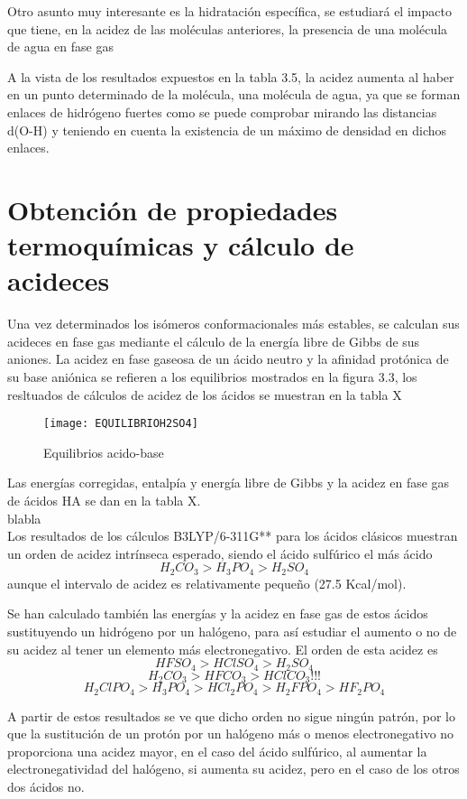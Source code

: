 Otro asunto muy interesante es la hidratación específica, se estudiará el impacto que tiene, en la acidez de las moléculas anteriores, la presencia de una molécula de agua en fase gas
 
A la vista de los resultados expuestos en la tabla 3.5, la acidez aumenta al haber en un punto determinado de la molécula, una molécula de agua, ya que se forman enlaces de hidrógeno fuertes como se puede comprobar mirando las distancias d(O-H) y teniendo en cuenta la existencia de un máximo de densidad en dichos enlaces.
 
\section{Obtención de propiedades termoquímicas y cálculo de acideces}

Una vez determinados los isómeros conformacionales más estables, se calculan sus acideces en fase gas mediante el cálculo de la energía libre de Gibbs de sus aniones.
La acidez en fase gaseosa de un ácido neutro y la afinidad protónica de su base aniónica se refieren a los equilibrios mostrados en la figura 3.3, los resltuados de cálculos de acidez de los ácidos se muestran en la tabla X
    \begin{figure}[h]
        \centering
        \texttt{[image: EQUILIBRIOH2SO4]}
        \caption{Equilibrios acido-base}
    \end{figure}

  

    
 
Las energías corregidas, entalpía y energía libre de Gibbs y la acidez en fase gas de ácidos HA se dan en la tabla X. \\
blabla \\

Los resultados de los cálculos B3LYP/6-311G** para los ácidos clásicos muestran un orden de acidez intrínseca esperado, siendo el ácido sulfúrico el más ácido
$$H_{2}CO_{3}>H_{3}PO_{4}>H_{2}SO_{4}$$ aunque el intervalo de acidez es relativamente pequeño (27.5 Kcal/mol).

Se han calculado también las energías y la acidez en fase gas de estos ácidos sustituyendo un hidrógeno por un halógeno, para así estudiar el aumento o no de su acidez al tener un elemento más electronegativo. El orden de esta acidez es $$ HFSO_{4} > HClSO_{4} > H_{2}SO_{4}$$ $$H_{2}CO_{3} > HFCO_{3} > HClCO_{3} !!!$$ $$ H_{2}ClPO_{4} > H_{3}PO_{4} > HCl_{2}PO_{4} > H_{2}FPO_{4} > HF_{2}PO_{4} $$

A partir de estos resultados se ve que dicho orden no sigue ningún patrón, por lo que la sustitución de un protón por un halógeno más o menos electronegativo no proporciona una acidez mayor, en el caso del ácido sulfúrico, al aumentar la electronegatividad del halógeno, si aumenta su acidez, pero en el caso de los otros dos ácidos no.

